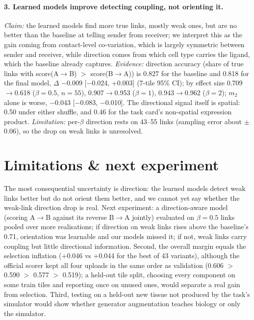 \documentclass{article}
\begin{document}
\paragraph{3. Learned models improve detecting coupling, not orienting it.}
\emph{Claim:} the learned models find more true links, mostly weak ones, but are no better than the baseline at
telling sender from receiver; we interpret this as the gain coming from contact-level co-variation, which is
largely symmetric between sender and receiver, while direction comes from which cell type carries the ligand, which
the baseline already captures. \emph{Evidence:} direction accuracy (share of true links with
score(A$\to$B) $>$ score(B$\to$A)) is 0.827 for the baseline and 0.818 for the final model, $\Delta$ $-$0.009
[$-$0.024, +0.003] (7-tile 95\% CI); by effect size 0.709$\to$0.618 ($\beta{=}0.5$, $n{=}55$), 0.907$\to$0.953
($\beta{=}1$), 0.943$\to$0.962 ($\beta{=}2$); $m_2$ alone is worse, $-$0.043 [$-$0.083, $-$0.010]. The directional
signal itself is spatial: 0.50 under either shuffle, and 0.46 for the task card's non-spatial expression product.
\emph{Limitation:} per-$\beta$ direction rests on 43--55 links (sampling error about $\pm$0.06), so the drop on weak
links is unresolved.

\section{Limitations \& next experiment}
The most consequential uncertainty is direction: the learned models detect weak links better but do not orient
them better, and we cannot yet say whether the weak-link direction drop is real. Next experiment: a direction-aware
model (scoring A$\to$B against its reverse B$\to$A jointly) evaluated on $\beta{=}0.5$ links pooled over more
realisations; if direction on weak links rises above the baseline's 0.71, orientation was learnable and our models
missed it; if not, weak links carry coupling but little directional information. Second, the overall margin equals
the selection inflation (+0.046 vs +0.044 for the best of 43 variants), although the official scorer kept all four
uploads in the same order as validation (0.606 $>$ 0.590 $>$ 0.577 $>$ 0.519); a held-out tile split, choosing every
component on some train tiles and reporting once on unused ones, would separate a real gain from selection. Third,
testing on a held-out new tissue not produced by the task's simulator would show whether generator augmentation
teaches biology or only the simulator.
\end{document}
